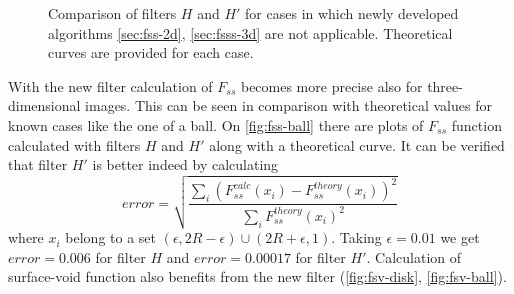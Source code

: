 \documentclass[reprint,amsmath,amssymb,aps,pre,showkeys,showpacs]{revtex4-1}
\begin{document}
\begin{figure}
  \centering
  \hfill
  \hfill
  \caption[]{Comparison of filters $H$ and $H'$ for cases in which newly
    developed algorithms \cref{sec:fss-2d}, \cref{sec:fsss-3d} are not
    applicable. Theoretical curves are provided for each case.}
  \label{fig:not-covered}
\end{figure}
With the new filter calculation of $F_{ss}$ becomes more precise also for
three-dimensional images. This can be seen in comparison with theoretical values
for known cases like the one of a ball. On \cref{fig:fss-ball} there are plots
of $F_{ss}$ function calculated with filters $H$ and $H'$ along with a
theoretical curve. It can be verified that filter $H'$ is better indeed by
calculating
\begin{equation*}
  error = \sqrt{\frac{\sum_i (F_{ss}^{calc}(x_i) -
      F_{ss}^{theory}(x_i))^2}{\sum_i F_{ss}^{theory}(x_i)^2}}
\end{equation*}
where $x_i$ belong to a set
$(\epsilon, 2R - \epsilon) \cup (2R + \epsilon, 1)$. Taking $\epsilon = 0.01$ we
get $error = 0.006$ for filter $H$ and $error = 0.00017$ for filter
$H'$. Calculation of surface-void function also benefits from the new filter
(\cref{fig:fsv-disk}, \cref{fig:fsv-ball}).
\end{document}
